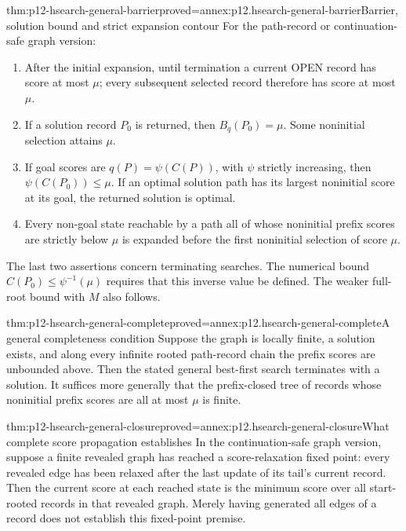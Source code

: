 \begin{hbtheorem}{thm:p12-hsearch-general-barrier}{proved=annex:p12.hsearch-general-barrier}{Barrier, solution bound and strict expansion contour}
For the path-record or continuation-safe graph version:
\begin{enumerate}
\item After the initial expansion, until termination a current OPEN
 record has score at most \(\mu\); every subsequent selected record
 therefore has score at most \(\mu\).
\item If a solution record \(P_0\) is returned, then
 \(B_q(P_0)=\mu\). Some noninitial selection attains \(\mu\).
\item If goal scores are \(q(P)=\psi(C(P))\), with \(\psi\)
 strictly increasing, then \(\psi(C(P_0))\le\mu\). If an optimal
 solution path has its largest noninitial score at its goal, the returned
 solution is optimal.
\item Every non-goal state reachable by a path all of whose noninitial
 prefix scores are strictly below \(\mu\) is expanded before the
 first noninitial selection of score \(\mu\).
\end{enumerate}
The last two assertions concern terminating searches. The numerical
bound \(C(P_0)\le\psi^{-1}(\mu)\) requires that this inverse value
be defined. The weaker full-root bound with \(M\) also follows.
\end{hbtheorem}

\begin{hbtheorem}{thm:p12-hsearch-general-complete}{proved=annex:p12.hsearch-general-complete}{A general completeness condition}
Suppose the graph is locally finite, a solution exists, and along every
infinite rooted path-record chain the prefix scores are unbounded above.
Then the stated general best-first search terminates with a solution.
It suffices more generally that the prefix-closed tree of records
whose noninitial prefix scores are all at most \(\mu\) is finite.
\end{hbtheorem}

\begin{hblemma}{thm:p12-hsearch-general-closure}{proved=annex:p12.hsearch-general-closure}{What complete score propagation establishes}
In the continuation-safe graph version, suppose a finite revealed graph
has reached a score-relaxation fixed point: every revealed edge has been
relaxed after the last update of its tail's current record. Then the
current score at each reached state is the minimum score over all
start-rooted records in that revealed graph. Merely having generated
all edges of a record does not establish this fixed-point premise.
\end{hblemma}

